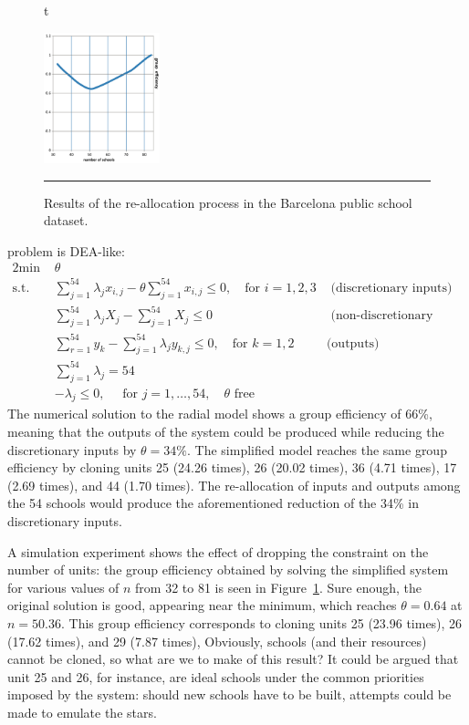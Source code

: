 \begin{figure}{t}
  \begin{center}
    \includegraphics[width=0.3\textwidth]{images/OPT/optimalefficiency}
  \end{center}
  \caption{\small Results of the re-allocation process in the Barcelona public school dataset.}\hrule
  \label{fig:overall}
\end{figure}
 problem is DEA-like:
\begin{alignat*}{2}
    \text{min }   & \theta & &\  \\
    \text{s.t. } & \sum_{j=1}^{54} \lambda_{j}x_{i,j}-\theta \sum_{j=1}^{54}x_{i,j} \leq 0,  \quad\text{for }i=1,2,3 & \text{ (discretionary inputs)}& \\
    & \sum_{j=1}^{54} \lambda_{j}X_{j}- \sum_{j=1}^{54}X_j \leq 0  &\text{ (non-discretionary input)} & \\
                       & \sum_{r=1}^{54}y_{k}-\sum_{j=1}^{54} \lambda_{j}y_{k,j}\leq 0, \quad \text{for }k=1,2 & \text{(outputs)}\\
                       & \sum_{j=1}^{54}\lambda_{j}=54 &  &\\
                       & -\lambda_{j}\leq 0, \quad\text{ for }j=1,\ldots,54, \quad \theta \text{ free} & & 
  \end{alignat*}
The numerical solution to the radial model shows a group efficiency of 66\%, meaning that the outputs of the system could be produced while reducing the discretionary inputs by $\theta=34\%$. The simplified model reaches the same group efficiency by cloning units 25 (24.26 times), 26 (20.02 times), 36 (4.71 times), 17 (2.69 times), and 44 (1.70 times). The re-allocation of inputs and outputs among the 54 schools would produce the aforementioned reduction of the 34\% in discretionary inputs.\par 
A simulation experiment shows the effect of dropping the constraint on the number of units: the group efficiency obtained by solving the simplified system for various values of $n$ from 32 to 81 is seen in Figure~\ref{fig:overall}. Sure enough, the original solution is good, appearing near the minimum, which reaches $\theta=0.64$ at $n = 50.36$. This group efficiency corresponds to cloning units 25 (23.96 times), 26 (17.62 times), and 29 (7.87 times), Obviously, schools (and their resources) cannot be cloned, so what are we to make of this result?  It could be argued that unit 25 and 26, for instance, are ideal schools under the common priorities imposed by the system: should new schools have to be built, attempts could be made to emulate the stars.


